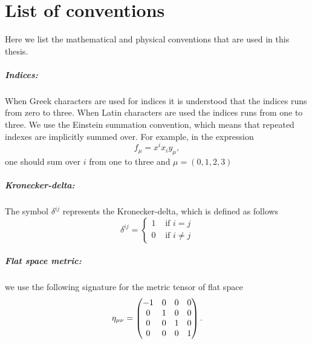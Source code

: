 \chapter{List of conventions}
Here we list the mathematical and physical 
conventions that are used in this thesis.

\paragraph{Indices:} When Greek characters are used for indices it is understood that the indices runs from
zero to three. When Latin characters are used the indices runs from one to three.   
We use the Einstein summation convention, which means that repeated indexes
are implicitly summed over. For example, in the expression 
\begin{equation}
f_\mu = x^i x_i y_\mu, \nonumber
\end{equation} one should sum over $i$ from one to three and $\mu = (0,1,2,3)$     
\paragraph{Kronecker-delta:} The symbol $\delta^{ij}$ represents the Kronecker-delta,
which is defined as follows
\begin{equation}
\delta^{ij} = \begin{cases} \nonumber
1 & \text{ if } i=j \\ \nonumber
0 & \text{ if } i \neq j \nonumber 
\end{cases}
\end{equation}
\paragraph{Flat space metric:} we use the following signature for the metric tensor of flat space
\begin{equation}
\eta_{\mu\nu} = 
\begin{pmatrix}
-1 & 0 & 0 & 0\\ 
 0& 1 & 0 & 0\\ 
0 & 0 & 1 & 0\\ 
0 & 0 & 0 & 1
\end{pmatrix}. \nonumber 
\end{equation}      
 

